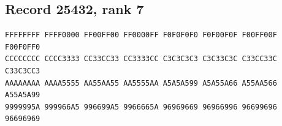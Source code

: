 \documentclass[11pt]{amsart}
\theoremstyle{definition}
\theoremstyle{remark}
\numberwithin{equation}{section}
\numberwithin{table}{section}
\begin{document}
\subsection*{Record 25432, rank 7}
\begin{Verbatim}[fontsize=\scriptsize,xleftmargin=1em]
FFFFFFFF FFFF0000 FF00FF00 FF0000FF F0F0F0F0 F0F00F0F F00FF00F F00F0FF0
CCCCCCCC CCCC3333 CC33CC33 CC3333CC C3C3C3C3 C3C33C3C C33CC33C C33C3CC3
AAAAAAAA AAAA5555 AA55AA55 AA5555AA A5A5A599 A5A55A66 A55AA566 A55A5A99
9999995A 999966A5 996699A5 9966665A 96969669 96966996 96699696 96696969
\end{Verbatim}
\par
{}\par
\end{document}
